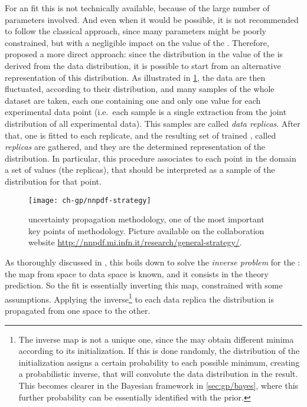 For an \nn fit this is not technically available, because of the large number
of parameters involved. And even when it would be possible, it is not
recommended to follow the classical approach, since many parameters might be
poorly constrained, but with a negligible impact on the value of the \pdfs.
%
Therefore, \nnpdf proposed a more direct approach: since the distribution in
the value of the \pdf is derived from the data distribution, it is possible to
start from an alternative representation of this distribution.
%
As illustrated in \cref{fig:gp/nnpdf}, the data are then fluctuated, according
to their distribution, and many samples of the whole dataset are taken, each
one containing one and only one value for each experimental data point (i.e.\
each sample is a single extraction from the joint distribution of all
experimental data).
%
This samples are called \textit{data replicas}.
%
After that, one \nn is fitted to each replicate, and the resulting set of
trained \acrshortpl{nn}, called \textit{\nn replicas} are gathered, and they
are the determined \mc representation of the \pdfs distribution.
%
In particular, this procedure associates to each point in the \pdfs domain a
set of values (the \nn replicas), that should be interpreted as a sample of the
\pdfs distribution for that point.

\begin{figure}
	\centering
	\texttt{[image: ch-gp/nnpdf-strategy]}
	\caption{
    \nnpdf uncertainty propagation methodology, one of the most important key
    points of \nnpdf methodology.
    Picture available on the collaboration website
    \url{http://nnpdf.mi.infn.it/research/general-strategy/}.
	}
	\label{fig:gp/nnpdf}
\end{figure}

As thoroughly discussed in \cite{DelDebbio:2021whr}, this boils down to solve
the \textit{inverse problem} for the \pdfs: the map from \pdf space to data
space is known, and it consists in the theory prediction. So the fit is
essentially inverting this map, constrained with some assumptions.
%
Applying the inverse\footnote{
  The inverse map is not a unique one, since the \nn may obtain different
  minima according to its initialization.
  If this is done randomly, the distribution of the initialization assigns a
  certain probability to each possible minimum, creating a probabilistic
  inverse, that will convolute the data distribution in the result.
  This becomes clearer in the Bayesian framework in \cref{sec:gp/bayes}, where
  this further probability can be essentially identified with the prior. 
} to each data replica the distribution is propagated from one space to the
other.

